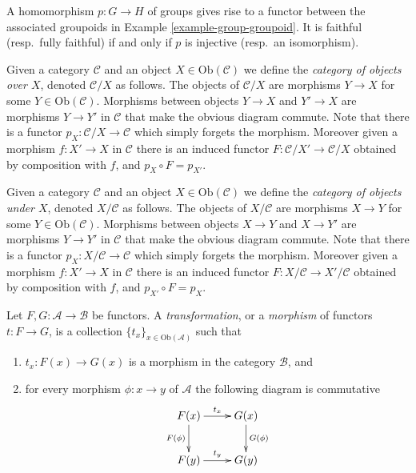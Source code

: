 \begin{example}
\label{example-group-homorphism-functor}
A homomorphism $p\colon G\to H$ of groups gives rise to a functor
between the associated groupoids in Example \ref{example-group-groupoid}. It is
faithful (resp.\ fully faithful) if and only if $p$ is injective (resp.\ an
isomorphism).
\end{example}

\begin{example}
\label{example-category-over-X}
Given a category $\mathcal{C}$ and an object $X\in \text{Ob}(\mathcal{C})$
we define the {\it category of objects over $X$},
denoted $\mathcal{C}/X$ as follows.
The objects of $\mathcal{C}/X$ are morphisms $Y\to X$ for
some $Y\in \text{Ob}(\mathcal{C})$. Morphisms between objects
$Y\to X$ and $Y'\to X$ are morphisms $Y\to Y'$ in $\mathcal{C}$ that
make the obvious diagram commute.  Note that there is a functor
$p_X\colon \mathcal{C}/X\to \mathcal{C}$ which simply forgets the
morphism.  Moreover given a morphism $f\colon X'\to X$ in
$\mathcal{C}$ there is an induced functor 
$F\colon \mathcal{C}/X' \to \mathcal{C}/X$ obtained by composition with $f$,
and $p_X\circ F = p_{X'}$.
\end{example}

\begin{example}
\label{example-category-under-X}
Given a category $\mathcal{C}$ and an object $X\in \text{Ob}(\mathcal{C})$
we define the {\it category of objects under $X$},
denoted $X/\mathcal{C}$ as follows.
The objects of $X/\mathcal{C}$ are morphisms $X\to Y$ for
some $Y\in \text{Ob}(\mathcal{C})$. Morphisms between objects
$X\to Y$ and $X\to Y'$ are morphisms $Y\to Y'$ in $\mathcal{C}$ that
make the obvious diagram commute.  Note that there is a functor
$p_X\colon X/\mathcal{C}\to \mathcal{C}$ which simply forgets the
morphism.  Moreover given a morphism $f\colon X'\to X$ in
$\mathcal{C}$ there is an induced functor 
$F\colon X/\mathcal{C} \to X'/\mathcal{C}$
obtained by composition with $f$,
and $p_{X'}\circ F = p_X$.
\end{example}




\begin{definition}
Let $F, G : \mathcal{A} \to \mathcal{B}$ be functors.
A {\it transformation}, or a {\it morphism} of functors
$t : F \to G$, is a collection $\{t_x\}_{x\in \text{Ob}(\mathcal{A})}$
such that
\begin{enumerate}
\item $t_x : F(x) \to G(x)$ is a morphism in the category $\mathcal{B}$, and
\item for every morphism $\phi : x \to y$ of $\mathcal{A}$ the following
diagram is commutative
$$
\xymatrix{
F(x) \ar[r]^{t_x} \ar[d]_{F(\phi)} & G(x) \ar[d]^{G(\phi)} \\
F(y) \ar[r]^{t_y} & G(y) }
$$
\end{enumerate}
\end{definition}

